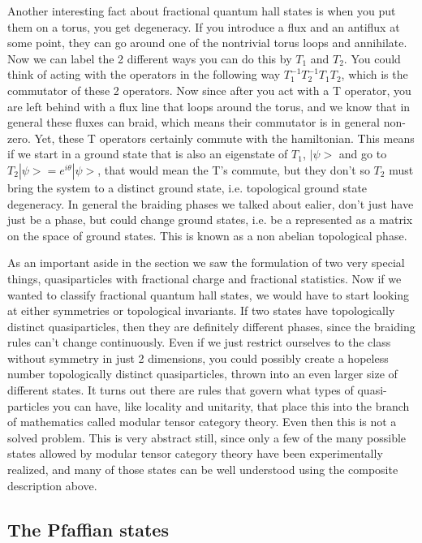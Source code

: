 Another interesting fact about fractional quantum hall states is when you put them on a torus, you get degeneracy. If you introduce a flux and an antiflux at some point, they can go around one of the nontrivial torus loops and annihilate. Now we can label the 2 different ways you can do this by $T_1$ and $T_2$. You could think of acting with the operators in the following way $T_1^{-1}T_2^{-1}T_1T_2$, which is the commutator of these 2 operators. Now since after you act with a T operator, you are left behind with a flux line that loops around the torus, and we know that in general these fluxes can braid, which means their commutator is in general non-zero. Yet, these T operators certainly commute with the hamiltonian. This means if we start in a ground state that is also an eigenstate of $T_1$, $|\psi>$ and go to $T_2|\psi>=e^{i\theta}|\psi>$, that would mean the T's commute, but they don't so $T_2$ must bring the system to a distinct ground state, i.e. topological ground state degeneracy. In general the braiding phases we talked about ealier, don't just have just be a phase, but could change ground states, i.e. be a represented as a matrix on the space of ground states. This is known as a non abelian topological phase.

As an important aside in the section we saw the formulation of two very special things, quasiparticles with fractional charge and fractional statistics. Now if we wanted to classify fractional quantum hall states, we would have to start looking at either symmetries or topological invariants. If two states have topologically distinct quasiparticles, then they are definitely different phases, since the braiding rules can't change continuously. Even if we just restrict ourselves to the class without symmetry in just 2 dimensions, you could possibly create a hopeless number topologically distinct quasiparticles, thrown into an even larger size of different states. It turns out there are rules that govern what types of quasi-particles you can have, like locality and unitarity, that place this into the branch of mathematics called modular tensor category theory. Even then this is not a solved problem. This is very abstract still, since only a few of the many possible states allowed by modular tensor category theory have been experimentally realized, and many of those states can be well understood using the composite description above.

\subsection{The Pfaffian states}

